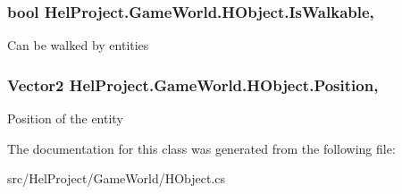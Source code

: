 \subsubsection[{Is\+Walkable}]{\setlength{\rightskip}{0pt plus 5cm}bool Hel\+Project.\+Game\+World.\+H\+Object.\+Is\+Walkable\hspace{0.3cm}{\ttfamily [get]}, {\ttfamily [set]}}\label{class_hel_project_1_1_game_world_1_1_h_object_a97444e657db0148fb442570fbd7fe98f}


Can be walked by entities 

\hypertarget{class_hel_project_1_1_game_world_1_1_h_object_af5297b9bdeac2d179b0bee66ff111f94}{}
\subsubsection[{Position}]{\setlength{\rightskip}{0pt plus 5cm}Vector2 Hel\+Project.\+Game\+World.\+H\+Object.\+Position\hspace{0.3cm}{\ttfamily [get]}, {\ttfamily [set]}}\label{class_hel_project_1_1_game_world_1_1_h_object_af5297b9bdeac2d179b0bee66ff111f94}


Position of the entity 



The documentation for this class was generated from the following file\+:\begin{DoxyCompactItemize}
\item 
src/\+Hel\+Project/\+Game\+World/H\+Object.\+cs\end{DoxyCompactItemize}
